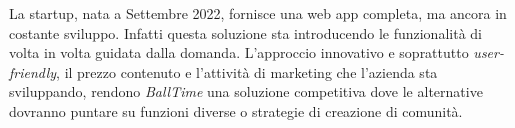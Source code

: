 La startup, nata a Settembre 2022, fornisce una web app completa, ma ancora in costante sviluppo. Infatti questa soluzione sta introducendo le funzionalità di volta in volta guidata dalla domanda. L'approccio innovativo e soprattutto \textit{user-friendly}, il prezzo contenuto e l'attività di marketing che l'azienda sta sviluppando, rendono \textit{BallTime} una soluzione competitiva dove le alternative dovranno puntare su funzioni diverse o strategie di creazione di comunità.

